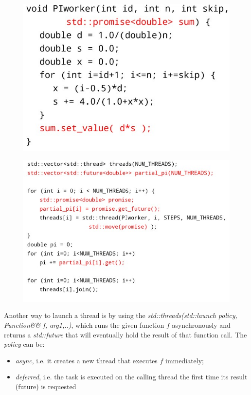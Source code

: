 \begin{figure}[h!]
		\centering
		\includegraphics[scale = 1.4]{img/futures_pi.jpg}
        \label{future_1}
\end{figure}

\begin{figure}[h!]
		\centering
		\includegraphics[scale = 1.4]{img/futures_pi_2.jpg}
        \label{future_2}
\end{figure}

Another way to launch a thread is by using the \textit{std::threads(std::launch policy, Function&& f, arg1,..)}, which runs the given function $f$ asynchronously and returns a \textit{std::future} that will eventually hold the result of that function call. The \textit{policy} can be:

\begin{itemize}
    \item \textit{async}, i.e. it creates a new thread that executes $f$ immediately;
    \item \textit{deferred}, i.e. the task is executed on the calling thread the first time its result (future) is requested
\end{itemize}

